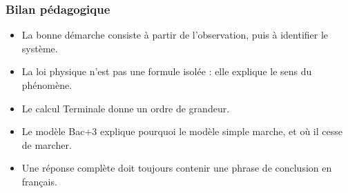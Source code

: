 \documentclass[11pt,a4paper]{article}
\begin{document}
\subsubsection*{Bilan pédagogique}

\begin{methodebox}
\begin{itemize}
  \item La bonne démarche consiste à partir de l'observation, puis à identifier le système.
  \item La loi physique n'est pas une formule isolée : elle explique le sens du phénomène.
  \item Le calcul Terminale donne un ordre de grandeur.
  \item Le modèle Bac+3 explique pourquoi le modèle simple marche, et où il cesse de marcher.
  \item Une réponse complète doit toujours contenir une phrase de conclusion en français.
\end{itemize}
\end{methodebox}
\end{document}
